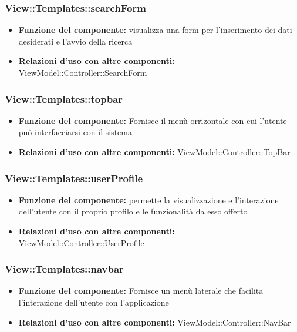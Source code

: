 \subsubsection{View::Templates::searchForm}
\begin{itemize}
\item\textbf{Funzione del componente:} visualizza una form per l’inserimento dei dati desiderati e l’avvio della ricerca\\
\item\textbf{Relazioni d'uso con altre componenti:} ViewModel::Controller::SearchForm\\
\end{itemize}
\subsubsection{View::Templates::topbar}
\begin{itemize}
\item\textbf{Funzione del componente:} Fornisce il menù orrizontale con cui l'utente può interfacciarsi con il sistema\\
\item\textbf{Relazioni d'uso con altre componenti:} ViewModel::Controller::TopBar\\
\end{itemize}
\subsubsection{View::Templates::userProfile}
\begin{itemize}
\item\textbf{Funzione del componente:} permette la visualizzazione e l'interazione dell'utente con il proprio profilo e le funzionalità da esso offerto\\
\item\textbf{Relazioni d'uso con altre componenti:} ViewModel::Controller::UserProfile\\
\end{itemize}
\subsubsection{View::Templates::navbar}
\begin{itemize}
\item\textbf{Funzione del componente:} Fornisce un menù laterale che facilita l'interazione dell'utente con l'applicazione\\
\item\textbf{Relazioni d'uso con altre componenti:} ViewModel::Controller::NavBar\\
\end{itemize}
